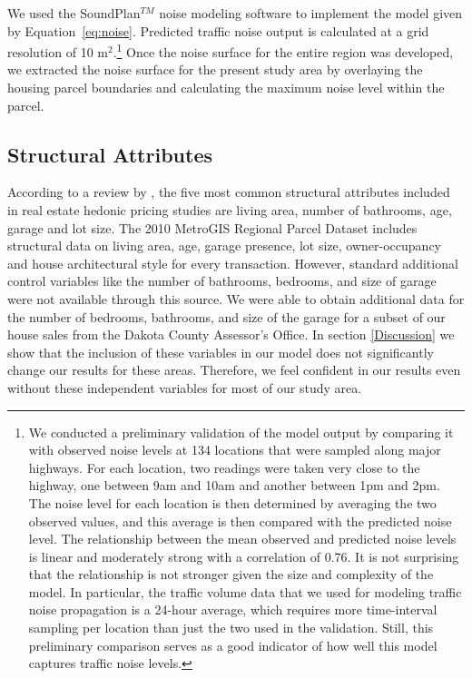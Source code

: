 \documentclass{article}\usepackage[]{graphicx}\usepackage[]{color}
\begin{document}
We used the SoundPlan$^{TM}$ noise modeling software to implement the model given by Equation~\eqref{eq:noise}. Predicted traffic noise output is calculated at a grid resolution of 10 m$^2$.\footnote{We conducted a preliminary validation of the model output by comparing it with observed noise levels at 134 locations that were sampled along major highways. For each location, two readings were taken very close to the highway, one between 9am and 10am and another between 1pm and 2pm. The noise level for each location is then determined by averaging the two observed values, and this average is then compared with the predicted noise level. The relationship between the mean observed and predicted noise levels is linear and moderately strong with a correlation of 0.76. It is not surprising that the relationship is not stronger given the size and complexity of the model. In particular, the traffic volume data that we used for modeling traffic noise propagation is a 24-hour average, which requires more time-interval sampling per location than just the two used in the validation. Still, this preliminary comparison serves as a good indicator of how well this model captures traffic noise levels.} Once the noise surface for the entire region was developed, we extracted the noise surface for the present study area by overlaying the housing parcel boundaries and calculating the maximum noise level within the parcel.

\subsection{Structural Attributes}
According to a review by \cite{Wilhelmsson2000}, the five most common structural attributes included in real estate hedonic pricing studies are living area, number of bathrooms, age, garage and lot size.  The 2010 MetroGIS Regional Parcel Dataset includes structural data on living area, age, garage presence, lot size, owner-occupancy and house architectural style for every transaction. However, standard additional control variables like the number of bathrooms, bedrooms, and size of garage were not available through this source. We were able to obtain additional data for the number of bedrooms, bathrooms, and size of the garage for a subset of our house sales from the Dakota County Assessor's Office. In section \ref{Discussion} we show that the inclusion of these variables in our model does not significantly change our results for these areas. Therefore, we feel confident in our results even without these independent variables for most of our study area. %
\end{document}
